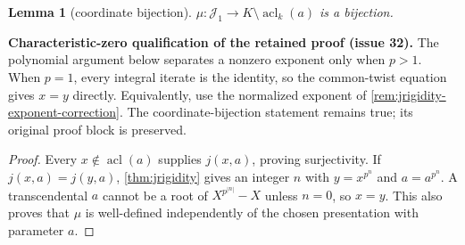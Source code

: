 \documentclass[11pt,oneside]{article}
\newtheorem{lemma}[theorem]{Lemma}
\theoremstyle{definition}
\theoremstyle{remark}
\newcommand{\acl}{\operatorname{acl}}
\newcommand{\Jrel}{\mathcal{J}}
\begin{document}
\begin{lemma}[coordinate bijection]\label{lem:mu-bij}
$\mu:\Jrel_1\to K\setminus\acl_k(a)$ is a bijection.
\end{lemma}
\noindent\textbf{Characteristic-zero qualification of the retained proof (issue 32).}
The polynomial argument below separates a nonzero exponent only when $p>1$. When $p=1$,
every integral iterate is the identity, so the common-twist equation gives $x=y$ directly.
Equivalently, use the normalized exponent of \cref{rem:jrigidity-exponent-correction}.
The coordinate-bijection statement remains true; its original proof block is preserved.

\begin{proof}
Every $x\notin\acl(a)$ supplies $j(x,a)$, proving surjectivity.  If
$j(x,a)=j(y,a)$, \cref{thm:jrigidity} gives an integer $n$ with
$y=x^{p^n}$ and $a=a^{p^n}$.  A transcendental $a$ cannot be a root of
$X^{p^{|n|}}-X$ unless $n=0$, so $x=y$.  This also proves that $\mu$ is well-defined
independently of the chosen presentation with parameter $a$.
\end{proof}
\end{document}
